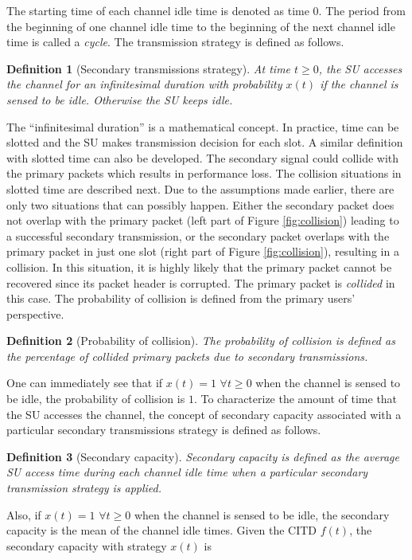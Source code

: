 \documentclass[10pt,final,journal,letterpaper]{IEEEtran}
\newtheorem{definition}{Definition}
\begin{document}
\par
The starting time of each channel idle time is denoted as time $0$. The period from the beginning of one channel idle time to the beginning of the next channel idle time is called a \emph{cycle}. The transmission strategy is defined as follows.
\begin{definition}[Secondary transmissions strategy]
At time $t\geq 0$, the SU accesses the channel for an infinitesimal duration with probability $x(t)$ if the channel is sensed to be idle. Otherwise the SU keeps idle.
\end{definition}
The ``infinitesimal duration'' is a mathematical concept. In practice, time can be slotted and the SU makes transmission decision for each slot. A similar definition with slotted time can also be developed. The secondary signal could collide with the primary packets which results in performance loss. The collision situations in slotted time are described next. Due to the assumptions made earlier, there are only two situations that can possibly happen. Either the secondary packet does not overlap with the primary packet (left part of Figure \ref{fig:collision}) leading to a successful secondary transmission, or the secondary packet overlaps with the primary packet in just one slot (right part of Figure \ref{fig:collision}), resulting in a collision. In this situation, it is highly likely that the primary packet cannot be recovered since its packet header is corrupted. The primary packet is \emph{collided} in this case. The probability of collision is defined from the primary users' perspective.
\begin{definition}[Probability of collision]
The probability of collision is defined as the percentage of \emph{collided} primary packets due to secondary transmissions.
\end{definition}
One can immediately see that if $x(t)=1$ $\forall t\geq 0$ when the channel is sensed to be idle, the probability of collision is $1$. To characterize the amount of time that the SU accesses the channel, the concept of secondary capacity associated with a particular secondary transmissions strategy is defined as follows.
\begin{definition}[Secondary capacity]
Secondary capacity is defined as the average SU access time during each channel idle time when a particular secondary transmission strategy is applied.
\end{definition}
Also, if $x(t)=1$ $\forall t\geq 0$ when the channel is sensed to be idle, the secondary capacity is the mean of the channel idle times. Given the CITD $f(t)$, the secondary capacity with strategy $x(t)$ is
\end{document}
